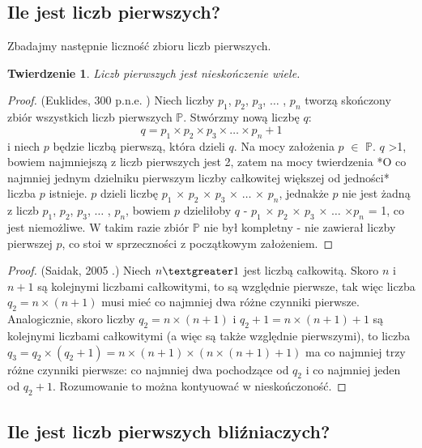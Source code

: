 \documentclass[10pt,onecolumn]{article}
\newtheorem{theorem}{Twierdzenie}
\theoremstyle{definition}
\theoremstyle{hypothesis}
\theoremstyle{capability}
\begin{document}
\subsection{Ile jest liczb pierwszych?}

Zbadajmy następnie liczność zbioru liczb pierwszych.

\begin{theorem}
Liczb pierwszych jest nieskończenie wiele.
\end{theorem}
 
\begin{proof}
(Euklides, 300 p.n.e. \cite{euklides300bc}) Niech liczby $p_1$, $p_2$, $p_3$, $\ldots$ , $p_n$ tworzą skończony zbiór wszystkich liczb pierwszych $\mathbb{P}$. Stwórzmy nową liczbę $q$: $$ q = p_1 \times p_2 \times p_3 \times \ldots \times p_n + 1$$ i niech $p$ będzie liczbą pierwszą, która dzieli $q$. Na mocy założenia $p$ $\in$ $\mathbb{P}$.
$q$ \textgreater 1, bowiem najmniejszą z liczb pierwszych jest 2, zatem na mocy twierdzenia *O co najmniej jednym dzielniku pierwszym liczby całkowitej większej od jedności* liczba $p$ istnieje. $p$ dzieli liczbę $p_1$ $\times$ $p_2$ $\times$ $p_3$ $\times$ $\ldots$ $\times$ $p_n$, jednakże $p$ nie jest żadną z liczb  $p_1$, $p_2$, $p_3$, $\ldots$ , $p_n$, bowiem $p$ dzieliłoby $q$ - $p_1$ $\times$ $p_2$ $\times$ $p_3$ $\times$ $\ldots$ $\times p_n$ = 1, co jest niemożliwe. W takim razie zbiór $\mathbb{P}$ nie był kompletny - nie zawierał liczby pierwszej $p$, co stoi w sprzeczności z początkowym założeniem.
\end{proof}

\begin{proof}
(Saidak, 2005 \cite{saidak2005}.) Niech $n \textgreater 1$ jest liczbą całkowitą. Skoro $n$ i $n+1$ są kolejnymi liczbami całkowitymi, to są względnie pierwsze, tak więc liczba $q_2 = n \times (n+1)$ musi mieć co najmniej dwa różne czynniki pierwsze. Analogicznie, skoro liczby $q_2 = n \times (n+1)$ i $q_2+1 = n \times  (n+1)+1$ są kolejnymi liczbami całkowitymi (a więc są także względnie pierwszymi), to liczba $q_3 = q_2 \times (q_2+1) = n \times (n+1) \times (n \times (n+1) +1)$ ma co najmniej trzy różne czynniki pierwsze: co najmniej dwa pochodzące od $q_2$ i co najmniej jeden od $q_2+1$. Rozumowanie to można kontyuować w nieskończoność.
\end{proof}

\subsection{Ile jest liczb pierwszych bliźniaczych?}
\end{document}
